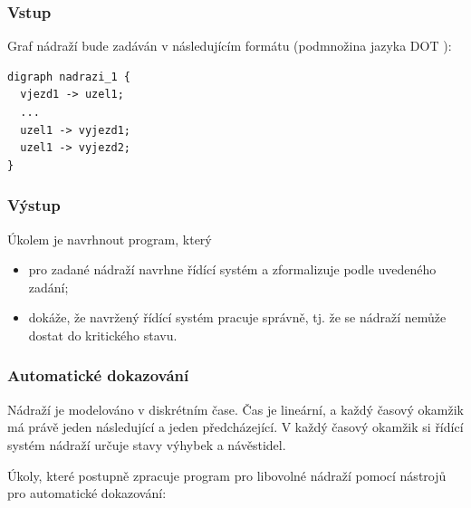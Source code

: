 \documentclass[a4paper,journal]{IEEEtran}
\begin{document}
\subsubsection{Vstup}
Graf nádraží bude zadáván v následujícím formátu 
(podmnožina jazyka DOT \cite{Graphviz}):

\begin{verbatim}
digraph nadrazi_1 { 
  vjezd1 -> uzel1; 
  ...
  uzel1 -> vyjezd1; 
  uzel1 -> vyjezd2; 
} 
\end{verbatim}

\subsubsection{Výstup}
Úkolem je navrhnout program, který
\begin{itemize}
	\item pro zadané nádraží navrhne řídící systém a zformalizuje podle uvedeného zadání;
	\item dokáže, že navržený řídící systém pracuje správně, tj. že se nádraží nemůže dostat 
	do kritického stavu.
\end{itemize}

\subsubsection{Automatické dokazování}
Nádraží je modelováno v diskrétním čase. Čas je lineární, a každý časový okamžik má právě jeden následující a jeden předcházející. V každý časový okamžik si řídící systém nádraží určuje stavy výhybek a návěstidel.

Úkoly, které postupně zpracuje program pro libovolné nádraží pomocí nástrojů pro automatické dokazování:
\end{document}
